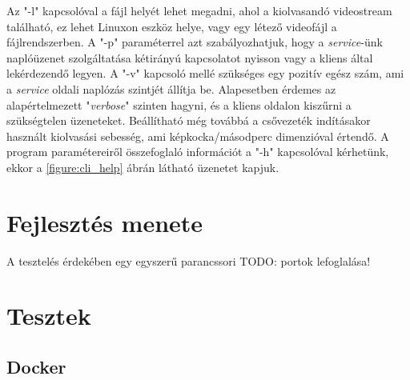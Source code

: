 Az "-l" kapcsolóval a fájl helyét lehet megadni, ahol a kiolvasandó videostream található, ez lehet Linuxon eszköz helye, vagy egy létező videofájl a fájlrendszerben.
A "-p" paraméterrel azt szabályozhatjuk, hogy a \emph{service}-ünk naplóüzenet szolgáltatása kétirányú kapcsolatot nyisson vagy a kliens által lekérdezendő legyen.
A "-v" kapcsoló mellé szükséges egy pozitív egész szám, ami a \emph{service} oldali naplózás szintjét állítja be. Alapesetben érdemes az alapértelmezett "\emph{verbose}" szinten hagyni, és a kliens oldalon kiszűrni a szükségtelen üzeneteket. 
Beállítható még továbbá a csővezeték indításakor használt kiolvasási sebesség, ami képkocka/másodperc dimenzióval értendő.
A program paramétereiről összefoglaló információt a "-h" kapcsolóval kérhetünk, ekkor a \ref{figure:cli_help} ábrán látható üzenetet kapjuk.

\section{Fejlesztés menete} \label{subs:fejlesztes_menete}


A tesztelés érdekében egy egyszerű parancssori TODO: portok lefoglalása!

\section{Tesztek}


\subsection{Docker}

